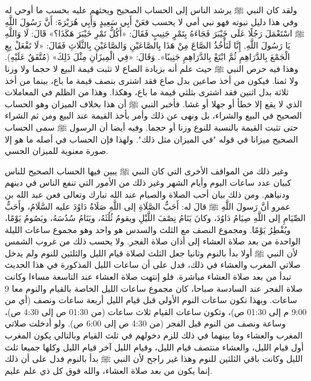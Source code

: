 ولقد كان النبي ﷺ يرشد الناس إلى الحساب الصحيح ويحثهم عليه بحسب ما أوحي له وفي هذا دليل نبوته فهو نبي أمي لا يحسب فعَنْ أَبِي سَعِيدٍ وَأَبِي هُرَيْرَةَ: أَنَّ رَسُولَ اللَّهِ ﷺ اسْتَعْمَلَ رَجُلًا عَلَى خَيْبَرَ فَجَاءَهُ بِتَمْرٍ جَنِيبٍ فَقَالَ: «أَكُلُّ تَمْرِ خَيْبَرَ هَكَذَا؟» قَالَ: لَا وَاللَّهِ يَا رَسُولَ اللَّهِ, إِنَّا لَنَأْخُذُ الصَّاعَ مِنْ هَذَا بِالصَّاعَيْنِ وَالصَّاعَيْنِ بِالثَّلَاثِ فَقَالَ: «لَا تَفْعَلْ بِعِ الْجَمْعَ بِالدَّرَاهِمِ ثُمَّ ابْتَعْ بِالدَّرَاهِمِ جَنِيبًا». وَقَالَ: «فِي الْمِيزَانِ مِثْلَ ذَلِكَ» {\footnotesize (مُتَّفَقٌ عَلَيْهِ)}.
وهذا فيه حرص النبي ﷺ حيث علم أنه بزيادة الصاع لا تثبت قيمة البيع لا حجما ولا وزنا ولا ثمنا. فيكون من أخذ صاعين بدل صاع فقد اشترى بنصف قيمة ما باع، بينما من أخذ ثلاثة بدل اثنين فقد اشترى بثلثي قيمة ما باع، وهكذا. وهذا من الظلم في المعاملات الذي لا يقع إلا خطأ أو جهلا أو غشا. فأخبر النبي ﷺ أن هذا بخلاف الميزان وهو الحساب الصحيح في البيع والشراء، بل ونهى عن ذلك وأمر بأخذ القيمة عند البيع ومن ثم الشراء حتى تثبت القيمة بالنسبة للنوع وزنا أو حجما. وفيه أيضا أن الرسول ﷺ سمى الحساب الصحيح ميزانا في قوله "في الميزان مثل ذلك". ولهذا فإن الحساب في أصله ما هو إلا صورة معنوية للميزان الحسي.

وغير ذلك من المواقف الأخرى التي كان النبي ﷺ يبين فيها الحساب الصحيح للناس كبيان عدد ساعات اليوم وأيام الشهر وغير ذلك من الأمور التي تنفع الناس في دينهم ودنياهم. ومن ذلك بيان أحب الصلاة والصيام عند الله تبارك وتعالى فعن عبد الله بن عمرو أنَّ رَسولَ اللَّهِ ﷺ قالَ له: أَحَبُّ الصَّلَاةِ إلى اللَّهِ صَلَاةُ دَاوُدَ عليه السَّلَامُ، وأَحَبُّ الصِّيَامِ إلى اللَّهِ صِيَامُ دَاوُدَ، وكانَ يَنَامُ نِصْفَ اللَّيْلِ ويقومُ ثُلُثَهُ، ويَنَامُ سُدُسَهُ، ويَصُومُ يَوْمًا، ويُفْطِرُ يَوْمًا. ومجموع النصف مع الثلث والسدس هو واحد وهو مجموع ساعات الليلة الواحدة من بعد صلاة العشاء إلى أذان صلاة الفجر. ولا يحسب ذلك من غروب الشمس لأن النبي ﷺ أولا بدأ بالنوم وثانيا جعل الثلث لصلاة قيام الليل والثلثين للنوم ولم يدخل صلاتي المغرب والعشاء في ذلك، فدل على أن ساعات الليل المذكورة في هذا الحديث تبدأ من بعد صلاة العشاء مباشرة. فلو إنتهت صلاة العشاء عند التاسعة مساءا وكانت صلاة الفجر عند السادسة صباحا، كان مجموع ساعات الليل الخاصة بالقيام والنوم معا 9 ساعات. وبهذا تكون ساعات النوم الأولى قبل قيام الليل أربعة ساعات ونصف (أي من 9:00 م إلى 01:30 ص)، وتكون ساعات القيام ثلاث ساعات (من 01:30 ص إلى 4:30 ص)، وساعة ونصف من النوم قبل الفجر (من 4:30 ص إلى 6:00 ص). ولو أدخلت صلاتي المغرب والعشاء وما بينهما في ذلك للزم دخولهم في ثلث القيام وبالتالي يكون المغرب أول قيام الليل، والعشاء منتصف قيام الليل، وقيام الليل آخر قيام الليل وكلها جميعا ثلث الليل وكانت باقي الثلثين للنوم وهذا غير راجح لأن النبي ﷺ بدأ بالنوم فدل على أن ذلك إنما يكون من بعد صلاة العشاء، والله فوق كل ذي علم عليم.

